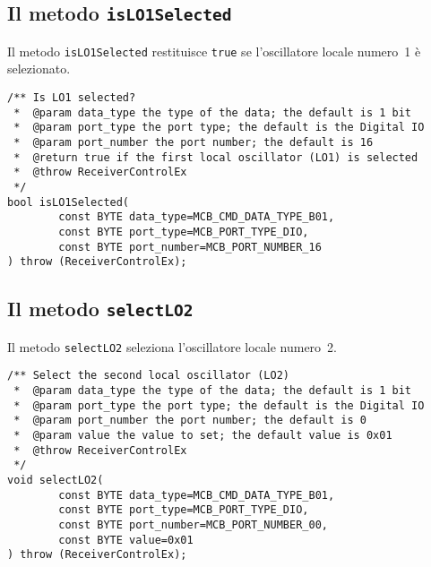 \subsection{Il metodo \texttt{isLO1Selected}}
Il metodo \texttt{isLO1Selected} restituisce \texttt{true} se 
l'oscillatore locale numero~1 \`e selezionato.
\lstset{language=C++}
\begin{lstlisting}[caption={Dichiarazione del metodo \texttt{isLO1Selected}},
label=lst:isLO1Selected,mathescape]
/** Is LO1 selected?
 *  @param data_type the type of the data; the default is 1 bit
 *  @param port_type the port type; the default is the Digital IO
 *  @param port_number the port number; the default is 16
 *  @return true if the first local oscillator (LO1) is selected
 *  @throw ReceiverControlEx
 */
bool isLO1Selected(
        const BYTE data_type=MCB_CMD_DATA_TYPE_B01,
        const BYTE port_type=MCB_PORT_TYPE_DIO,   
        const BYTE port_number=MCB_PORT_NUMBER_16
) throw (ReceiverControlEx);
\end{lstlisting}
\lstset{numbers=none}


\subsection{Il metodo \texttt{selectLO2}}
Il metodo \texttt{selectLO2} seleziona l'oscillatore locale numero~2.
\lstset{language=C++}
\begin{lstlisting}[caption={Dichiarazione del metodo \texttt{selectLO2}},
label=lst:selectLO2,mathescape]
/** Select the second local oscillator (LO2)
 *  @param data_type the type of the data; the default is 1 bit
 *  @param port_type the port type; the default is the Digital IO
 *  @param port_number the port number; the default is 0
 *  @param value the value to set; the default value is 0x01
 *  @throw ReceiverControlEx
 */
void selectLO2(
        const BYTE data_type=MCB_CMD_DATA_TYPE_B01,
        const BYTE port_type=MCB_PORT_TYPE_DIO,
        const BYTE port_number=MCB_PORT_NUMBER_00,
        const BYTE value=0x01
) throw (ReceiverControlEx);
\end{lstlisting}
\lstset{numbers=none}


